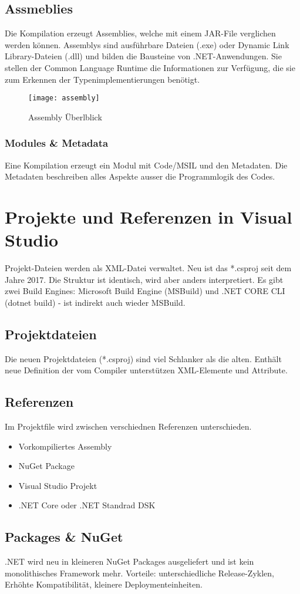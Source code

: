 \subsection{Assmeblies}
Die Kompilation erzeugt Assemblies, welche mit einem JAR-File verglichen werden können. Assemblys sind ausführbare Dateien (.exe) oder Dynamic Link Library-Dateien (.dll) und bilden die Bausteine von .NET-Anwendungen. Sie stellen der Common Language Runtime die Informationen zur Verfügung, die sie zum Erkennen der Typenimplementierungen benötigt.

\begin{figure}[h!]
	\centering
  	\texttt{[image: assembly]}
    \caption{Assembly Überlblick}
\end{figure}

\subsubsection{Modules \& Metadata}
Eine Kompilation erzeugt ein Modul mit Code/MSIL und den Metadaten. Die Metadaten beschreiben alles Aspekte ausser die Programmlogik des Codes.

\pagebreak

\section{Projekte und Referenzen in Visual Studio}
Projekt-Dateien werden als XML-Datei verwaltet. Neu ist das *.csproj seit dem Jahre 2017.  Die Struktur ist identisch, wird aber anders interpretiert. Es gibt zwei Build Engines: Microsoft Build Engine (MSBuild) und .NET CORE CLI (dotnet build) - ist indirekt auch wieder MSBuild.

\subsection{Projektdateien}
Die neuen Projektdateien (*.csproj) sind viel Schlanker als die alten. Enthält neue Definition der vom Compiler unterstützen XML-Elemente und Attribute. 

\subsection{Referenzen}
Im Projektfile wird zwischen verschiednen Referenzen unterschieden.
\begin{itemize}
  \itemsep -0.5em 
  \item Vorkompiliertes Assembly
  \item NuGet Package
  \item Visual Studio Projekt
  \item .NET Core oder .NET Standrad DSK
\end{itemize}

\subsection{Packages \& NuGet}
.NET wird neu in kleineren NuGet Packages ausgeliefert und ist kein monolithisches Framework mehr. Vorteile: unterschiedliche Release-Zyklen, Erhöhte Kompatibilität, kleinere Deploymenteinheiten.

\pagebreak
